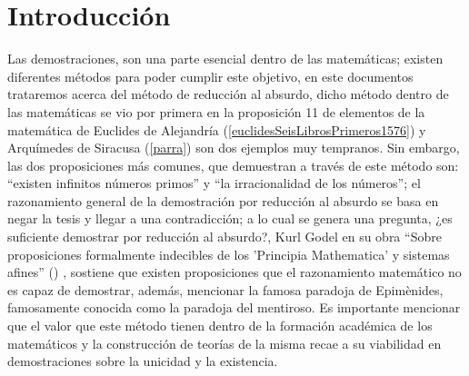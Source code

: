 
    \section{Introducción}
    Las demostraciones, son una parte esencial dentro de las matemáticas; existen diferentes métodos para poder cumplir este objetivo, en este documentos trataremos 
    acerca del método de reducción al absurdo, dicho método dentro de las matemáticas se vio por primera en la proposición 11 de elementos de la matemática de Euclides 
    de Alejandría (\ref{euclidesSeisLibrosPrimeros1576}) y Arquímedes de Siracusa (\ref{parra}) son dos ejemplos muy tempranos. Sin embargo, las dos proposiciones más comunes, 
    que demuestran a través de este método son: “existen infinitos números primos” y “la irracionalidad de los números”; el razonamiento general de la demostración por reducción 
    al absurdo se basa en negar la tesis y llegar a una contradicción; a lo cual se genera una pregunta, ¿es suficiente demostrar por reducción al absurdo?, Kurl Godel en su obra 
    “Sobre proposiciones formalmente indecibles de los 'Principia Mathematica' y sistemas afines” (\cite{bauer}) , sostiene que existen proposiciones que el 
    razonamiento matemático no es capaz de demostrar, además, mencionar la famosa paradoja de Epimènides, famosamente conocida como la paradoja del mentiroso. Es importante 
    mencionar que el valor que este método tienen dentro de la formación académica de los matemáticos y la construcción de teorías de la misma recae a su viabilidad en 
    demostraciones sobre la unicidad y la existencia.
